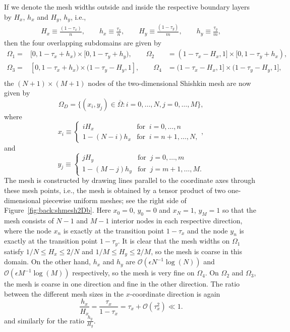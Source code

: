 If we denote the mesh widths outside and inside the respective boundary layers
by $H_x$, $h_x$ and $H_y$, $h_y$, i.e.,
%
\begin{eqnarray*}
H_{x}\equiv\frac{( 1-\tau_x)}{n}, \qquad
h_{x}\equiv\frac{\tau_x}{n},\qquad
H_{y}\equiv\frac{( 1-\tau_y)}{m},\qquad
h_{y}\equiv\frac{\tau_y}{m},
\end{eqnarray*}
then the four overlapping subdomains are given by
%
\begin{eqnarray}\label{eq:back:subdomains_a}
\Omega_{1}=&[0,1-\tau_x+h_x)\times[0,1-\tau_y+h_y),\qquad\Omega_{2}&=(1-\tau_x-H_x,1]\times[0,1-\tau_y+h_x),\nonumber\\
\Omega_{3}=&[0,1-\tau_x+h_x)\times(1-\tau_y-H_y,1],\qquad\Omega_{4}&=(1-\tau_x-H_x,1]\times(1-\tau_y-H_y,1],\nonumber\\
\end{eqnarray}
%
the $(N+1)\times(M+1)$ nodes of the two-dimensional Shishkin mesh are now given
by
$$
\Omega_D=\{(x_i,y_j)\in\overline{\Omega}:i=0,\ldots,N, j=0,\ldots,M\},
$$
where
%
$$
x_i\equiv
\begin{cases} iH_x &\mbox{for}\;\; i=0,\ldots,n \\
1-(N-i)h_x &\mbox{for}\;\; i=n+1,\ldots,N, \end{cases},
$$
and
$$
y_j\equiv
\begin{cases} jH_y &\mbox{for}\;\; j=0,\ldots,m \\
1-(M-j)h_y &\mbox{for}\;\; j=m+1,\ldots,M. \end{cases}
$$
%
The mesh is constructed by drawing lines parallel to the coordinate axes
through these mesh points, i.e., the mesh is obtained by a tensor product of
two one-dimensional piecewise uniform meshes; see the right side of
Figure~\ref{fig:back:shmesh2Db}. Here $x_0=0$, $y_0=0$ and $x_N=1$, $y_M=1$
so that the mesh consists of $N-1$ and $M-1$ interior nodes in each respective
direction, where the node $x_n$ is exactly at the transition point $1-\tau_x$
and the node $y_n$ is exactly at the transition point $1-\tau_y$.
It is clear that the mesh widths on $\Omega_{1}$ satisfy
$1/N\leq H_x\leq 2/N$ and $1/M\leq H_y\leq 2/M$, so the mesh is coarse in this
domain. On the other hand, $h_x$ and $h_y$ are
$\mathscr{O}(\epsilon N^{-1}\log(N))$ and
$\mathscr{O}(\epsilon M^{-1}\log(M))$ respectively,
so the mesh is very fine on $\Omega_{4}$. On $\Omega_{2}$ and $\Omega_{3}$, the
mesh is coarse in one direction and fine in the other direction. The ratio
between the different mesh sizes in the $x$-coordinate direction is again
%
\[\frac{h_x}{H_x}=\frac{\tau_x}{1-\tau_x}=\tau_x+\mathscr{O}(\tau_x^2) \ll 1.\]
%
and similarly for the ratio $\frac{h_y}{H_y}$.

